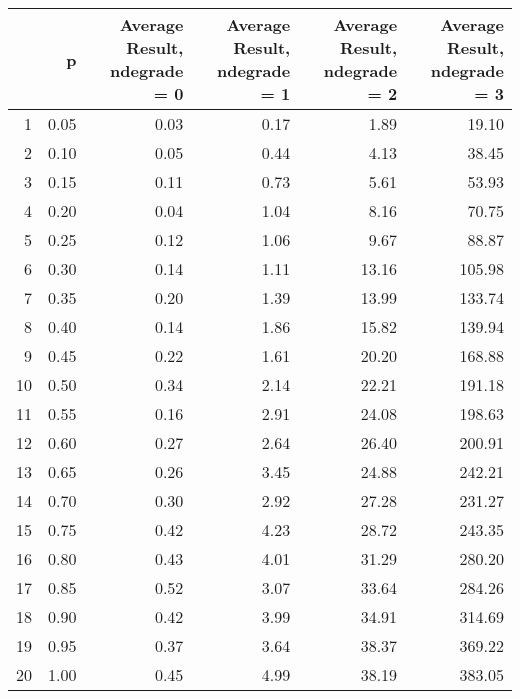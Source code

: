 \begin{table}[ht]
\centering
\begin{tabular}{rrrrrr}
  \hline
 & p & Average Result, ndegrade = 0 & Average Result, ndegrade = 1 & Average Result, ndegrade = 2 & Average Result, ndegrade = 3 \\ 
  \hline
1 & 0.05 & 0.03 & 0.17 & 1.89 & 19.10 \\ 
  2 & 0.10 & 0.05 & 0.44 & 4.13 & 38.45 \\ 
  3 & 0.15 & 0.11 & 0.73 & 5.61 & 53.93 \\ 
  4 & 0.20 & 0.04 & 1.04 & 8.16 & 70.75 \\ 
  5 & 0.25 & 0.12 & 1.06 & 9.67 & 88.87 \\ 
  6 & 0.30 & 0.14 & 1.11 & 13.16 & 105.98 \\ 
  7 & 0.35 & 0.20 & 1.39 & 13.99 & 133.74 \\ 
  8 & 0.40 & 0.14 & 1.86 & 15.82 & 139.94 \\ 
  9 & 0.45 & 0.22 & 1.61 & 20.20 & 168.88 \\ 
  10 & 0.50 & 0.34 & 2.14 & 22.21 & 191.18 \\ 
  11 & 0.55 & 0.16 & 2.91 & 24.08 & 198.63 \\ 
  12 & 0.60 & 0.27 & 2.64 & 26.40 & 200.91 \\ 
  13 & 0.65 & 0.26 & 3.45 & 24.88 & 242.21 \\ 
  14 & 0.70 & 0.30 & 2.92 & 27.28 & 231.27 \\ 
  15 & 0.75 & 0.42 & 4.23 & 28.72 & 243.35 \\ 
  16 & 0.80 & 0.43 & 4.01 & 31.29 & 280.20 \\ 
  17 & 0.85 & 0.52 & 3.07 & 33.64 & 284.26 \\ 
  18 & 0.90 & 0.42 & 3.99 & 34.91 & 314.69 \\ 
  19 & 0.95 & 0.37 & 3.64 & 38.37 & 369.22 \\ 
  20 & 1.00 & 0.45 & 4.99 & 38.19 & 383.05 \\ 
   \hline
\end{tabular}
\end{table}

